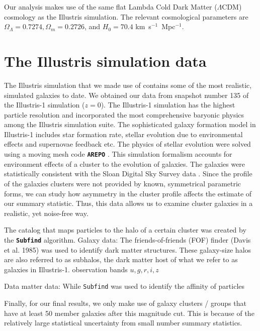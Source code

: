 Our analysis makes use of the same flat Lambda Cold Dark Matter ($\Lambda$CDM) cosmology
as the Illustris simulation. The relevant cosmological parameters are
$\Omega_\Lambda = 0.7274, \Omega_m = 0.2726$, and $H_0 = 70.4$
km~s$^{-1}$~Mpc$^{-1}$.

\section{The Illustris simulation data} 
\label{sec:illustris_sim}
The Illustris simulation that we made use of contains some of the most
realistic, simulated galaxies to date. We obtained our data from 
snapshot number 135 of the Illustris-1 simulation ($z=0$). The Illustris-1
simulation has the highest particle resolution and incorporated the most 
comprehensive baryonic physics among the Illustris simulation suite. 
The sophisticated galaxy formation model in Illustris-1 
 includes star formation rate, stellar evolution due to
environmental effects and supernovae feedback etc. The physics of stellar
evolution were solved using a moving mesh code {\bf \texttt{AREPO}} \citep{Springel2010}.
This simulation formalism accounts for environment effects of a cluster to the
evolution of galaxies. The galaxies were statistically consistent
with the Sloan Digital Sky Survey data
\citet{Vogelsberger2014}. Since the profile of the galaxies clusters were not
provided by known, symmetrical parametric forms, we can study 
how asymmetry in the cluster profile affects the estimate of our summary 
statistic. Thus, this data allows us to examine cluster galaxies
in a realistic, yet noise-free way.

The catalog that maps particles to the halo of a certain cluster was created by
the {\bf \texttt{Subfind}} algorithm.
Galaxy data: 
The friends-of-friends (FOF) finder (Davis et al. 1985) was used to identify
dark matter structures. These galaxy-size halos are also referred to as
subhalos, the dark matter host of what we refer to as galaxies in Illustris-1. 
observation bands $u, g, r, i, z$

Data matter data:
While \texttt{Subfind} was used to identify the affinity of particles 

Finally, for our final results, we only make use of galaxy clusters / groups 
that have at least 50 member galaxies after this magnitude cut. This is because
of the relatively large statistical uncertainty from small number summary
statistics. 


